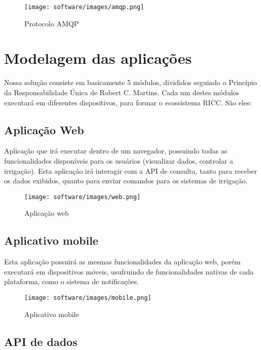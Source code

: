     \begin{figure}[H]
        \centering
        \texttt{[image: software/images/amqp.png]}
        \caption{Protocolo AMQP}
        \label{fig:amqp}
    \end{figure}

    \section{Modelagem das aplicações}
    
    Nossa solução consiste em basicamente 5 módulos, divididos seguindo  o Princípio da Responsabilidade Única de Robert C. Martins. Cada um destes módulos executará em diferentes dispositivos, para formar o  ecossistema RICC. São eles:
    
    \subsection{Aplicação Web}

    Aplicação que irá executar dentro de um navegador, possuindo todas as funcionalidades disponíveis para os usuários (visualizar dados, controlar a irrigação).
	Esta aplicação irá interagir com a API de consulta, tanto para receber os dados exibidos, quanto para enviar comandos para os sistemas de irrigação.

    \begin{figure}[H]
        \texttt{[image: software/images/web.png]}
        \caption{Aplicação web}
        \label{fig:web}
    \end{figure}

    \subsection{Aplicativo mobile}

    Esta aplicação possuirá as mesmas funcionalidades da aplicação web, porém executará em dispositivos móveis, usufruindo de funcionalidades nativas de cada plataforma, como o sistema de notificações.

    \begin{figure}[H]
        \texttt{[image: software/images/mobile.png]}
        \caption{Aplicativo mobile}
        \label{fig:mobile}
    \end{figure}

    \subsection{API de dados}

